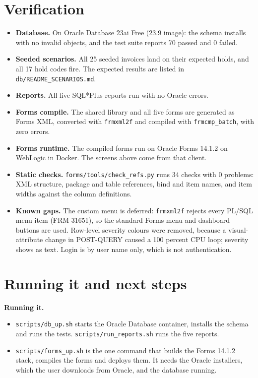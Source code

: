 \documentclass[10pt,a4paper]{article}
\begin{document}
\FloatBarrier
\section{Verification}

\begin{itemize}[leftmargin=1.2em,itemsep=3pt]
  \item \textbf{Database.} On Oracle Database 23ai Free (23.9 image): the schema installs with no invalid objects, and the test suite reports 70 passed and 0 failed.
  \item \textbf{Seeded scenarios.} All 25 seeded invoices land on their expected holds, and all 17 hold codes fire. The expected results are listed in \texttt{db/README\_SCENARIOS.md}.
  \item \textbf{Reports.} All five SQL*Plus reports run with no Oracle errors.
  \item \textbf{Forms compile.} The shared library and all five forms are generated as Forms XML, converted with \texttt{frmxml2f} and compiled with \texttt{frmcmp\_batch}, with zero errors.
  \item \textbf{Forms runtime.} The compiled forms run on Oracle Forms 14.1.2 on WebLogic in Docker. The screens above come from that client.
  \item \textbf{Static checks.} \texttt{forms/tools/check\_refs.py} runs 34 checks with 0 problems: XML structure, package and table references, bind and item names, and item widths against the column definitions.
  \item \textbf{Known gaps.} The custom menu is deferred: \texttt{frmxml2f} rejects every PL/SQL menu item (FRM-31651), so the standard Forms menu and dashboard buttons are used. Row-level severity colours were removed, because a visual-attribute change in POST-QUERY caused a 100 percent CPU loop; severity shows as text. Login is by user name only, which is not authentication.
\end{itemize}

\section{Running it and next steps}

\textbf{Running it.}
\begin{itemize}[leftmargin=1.2em,itemsep=2pt]
  \item \texttt{scripts/db\_up.sh} starts the Oracle Database container, installs the schema and runs the tests. \texttt{scripts/run\_reports.sh} runs the five reports.
  \item \texttt{scripts/forms\_up.sh} is the one command that builds the Forms 14.1.2 stack, compiles the forms and deploys them. It needs the Oracle installers, which the user downloads from Oracle, and the database running.
\end{itemize}
\end{document}
